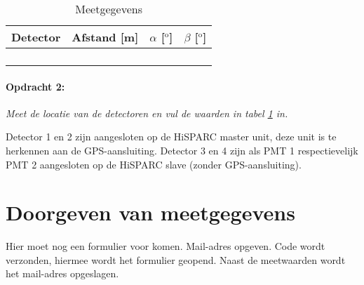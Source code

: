 \begin{table}[h]
\noindent \begin{centering}
\begin{tabular}{|>{\centering}p{3.5cm}|>{\centering}p{3.5cm}|>{\centering}p{3.5cm}|>{\centering}p{3.5cm}|}
\hline 
Detector & Afstand {[}m{]} & $\alpha$ {[}$^{\mathrm{o}}${]} & $\beta$ {[}$^{\mathrm{o}}${]}\tabularnewline
\hline 
\hline 
1 &  &  & \tabularnewline
\hline 
2 &  &  & \tabularnewline
\hline 
3 &  &  & \tabularnewline
\hline 
4 &  &  & \tabularnewline
\hline 
\end{tabular}
\par\end{centering}

\caption{\label{tab:Meetgegevens}Meetgegevens}
\end{table}



\paragraph{Opdracht 2:}

\textit{Meet de locatie van de detectoren en vul de waarden in tabel
\ref{tab:Meetgegevens} in.}

Detector 1 en 2 zijn aangesloten op de HiSPARC master unit, deze unit
is te herkennen aan de GPS-aansluiting. Detector 3 en 4 zijn als PMT
1 respectievelijk PMT 2 aangesloten op de HiSPARC slave (zonder GPS-aansluiting).


\section{Doorgeven van meetgegevens}

Hier moet nog een formulier voor komen. Mail-adres opgeven. Code wordt
verzonden, hiermee wordt het formulier geopend. Naast de meetwaarden
wordt het mail-adres opgeslagen.

